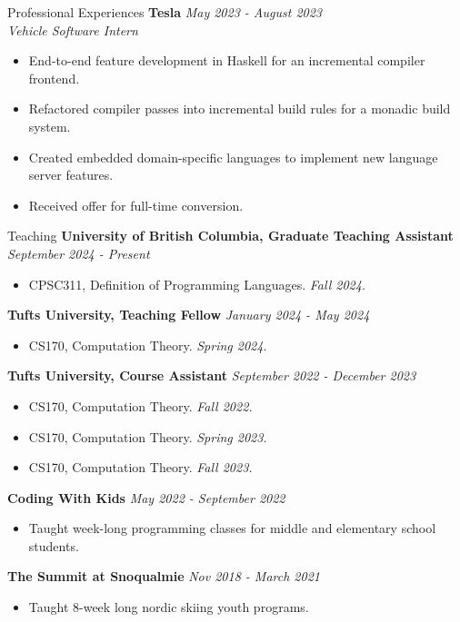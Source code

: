 \documentclass{resume} %
\begin{document}
\begin{rSection}{Professional Experiences}
{\bf Tesla} \hfill {\em May 2023 - August 2023}\\
\hfill {\it Vehicle Software Intern}
\begin{itemize}
    \item End-to-end feature development in Haskell for an incremental compiler frontend.
    \item Refactored compiler passes into incremental build rules for a monadic build system.
    \item Created embedded domain-specific languages to implement new language server features.
    \item Received offer for full-time conversion.
\end{itemize}
\end{rSection}

\begin{rSection}{Teaching}
{\bf University of British Columbia, Graduate Teaching Assistant} \hfill {\em September 2024 - Present}
\begin{itemize}
    \item CPSC311, Definition of Programming Languages. {\it Fall 2024.}
\end{itemize}

{\bf Tufts University, Teaching Fellow} \hfill {\em January 2024 - May 2024}
\begin{itemize}
    \item CS170, Computation Theory. {\it Spring 2024.}
\end{itemize}

{\bf Tufts University, Course Assistant} \hfill {\em September 2022 - December 2023}
\begin{itemize}
    \item CS170, Computation Theory. {\it Fall 2022.}
    \item CS170, Computation Theory. {\it Spring 2023.}
    \item CS170, Computation Theory. {\it Fall 2023.}
\end{itemize}

{\bf Coding With Kids} \hfill {\em May 2022 - September 2022}
\begin{itemize}
    \item Taught week-long programming classes for middle and elementary school students.
\end{itemize}

{\bf The Summit at Snoqualmie} \hfill {\em Nov 2018 - March 2021}
\begin{itemize}
    \item Taught 8-week long nordic skiing youth programs.
\end{itemize}
    
\end{rSection}
\end{document}
